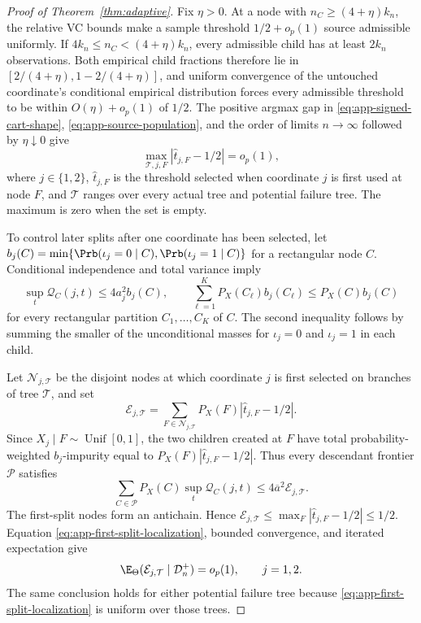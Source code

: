 \begin{appendix}
\begin{proof}[Proof of Theorem~\ref{thm:adaptive}]
Fix \(\eta>0\). At a node with \(n_C\ge(4+\eta)k_n\), the relative VC bounds
make a sample threshold \(1/2+o_p(1)\) source admissible uniformly. If
\(4k_n\le n_C<(4+\eta)k_n\), every admissible child has at least \(2k_n\)
observations. Both empirical child fractions therefore lie in
\([2/(4+\eta),1-2/(4+\eta)]\), and uniform convergence of the untouched
coordinate's conditional empirical distribution forces every admissible
threshold to be within \(O(\eta)+o_p(1)\) of \(1/2\). The positive argmax gap
in \eqref{eq:app-signed-cart-shape}, \eqref{eq:app-source-population}, and the
order of limits \(n\to\infty\) followed by \(\eta\downarrow0\) give
\begin{equation}\label{eq:app-first-split-localization}
\max_{\mathcal T,j,F}
|\widehat t_{j,F}-1/2|=o_p(1),
\end{equation}
where \(j\in\{1,2\}\), \(\widehat t_{j,F}\) is the threshold selected when
coordinate \(j\) is first used at node \(F\), and \(\mathcal T\) ranges over
every actual tree and potential failure tree. The maximum is zero when the set
is empty.

To control later splits after one coordinate has been selected, let
\(b_j(C)=\min\{\Prb(\iota_j=0\mid C),\Prb(\iota_j=1\mid C)\}\) for a
rectangular node \(C\). Conditional independence and total variance imply
\[
\sup_t\mathcal Q_C(j,t)\le4a_j^2b_j(C),
\qquad
\sum_{\ell=1}^KP_X(C_\ell)b_j(C_\ell)
\le P_X(C)b_j(C)
\]
for every rectangular partition \(C_1,\ldots,C_K\) of \(C\). The second
inequality follows by summing the smaller of the unconditional masses for
\(\iota_j=0\) and \(\iota_j=1\) in each child.

Let \(\mathcal N_{j,\mathcal T}\) be the disjoint nodes at which coordinate
\(j\) is first selected on branches of tree \(\mathcal T\), and set
\begin{equation}\label{eq:app-weighted-threshold-error}
\mathcal E_{j,\mathcal T}
=\sum_{F\in\mathcal N_{j,\mathcal T}}
P_X(F)|\widehat t_{j,F}-1/2|.
\end{equation}
Since \(X_j\mid F\sim\operatorname{Unif}[0,1]\), the two children created at
\(F\) have total probability-weighted \(b_j\)-impurity equal to
\(P_X(F)|\widehat t_{j,F}-1/2|\). Thus every descendant frontier
\(\mathcal P\) satisfies
\begin{equation}\label{eq:app-frontier-residual-gain}
\sum_{C\in\mathcal P}P_X(C)\sup_t\mathcal Q_C(j,t)
\le4\overline a^2\mathcal E_{j,\mathcal T}.
\end{equation}
The first-split nodes form an antichain. Hence
\(\mathcal E_{j,\mathcal T}\le\max_F|\widehat t_{j,F}-1/2|\le1/2\).
Equation \eqref{eq:app-first-split-localization}, bounded convergence, and
iterated expectation give
\begin{equation}\label{eq:app-weighted-error-vanishes}
\E_\Theta(\mathcal E_{j,\mathcal T}\mid\mathcal D_n^+)=o_p(1),
\qquad j=1,2.
\end{equation}
The same conclusion holds for either potential failure tree because
\eqref{eq:app-first-split-localization} is uniform over those trees.


\end{proof}
\end{appendix}
